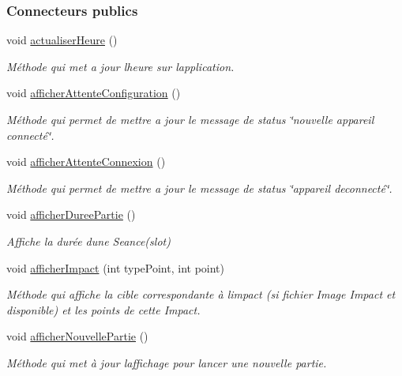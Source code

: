 \subsubsection*{Connecteurs publics}
\begin{DoxyCompactItemize}
\item 
void \hyperlink{class_ihm_ad8b3b13e638ebbfbe8159d00d99ff88f}{actualiser\+Heure} ()
\begin{DoxyCompactList}\small\item\em Méthode qui met a jour l\textquotesingle{}heure sur l\textquotesingle{}application. \end{DoxyCompactList}\item 
void \hyperlink{class_ihm_a3d1f9b366774b538acfcf66195c3c81a}{afficher\+Attente\+Configuration} ()
\begin{DoxyCompactList}\small\item\em Méthode qui permet de mettre a jour le message de status \char`\"{}nouvelle appareil connecté\char`\"{}. \end{DoxyCompactList}\item 
void \hyperlink{class_ihm_a46f511e7be2c138a8fe2dec17d6bb2bf}{afficher\+Attente\+Connexion} ()
\begin{DoxyCompactList}\small\item\em Méthode qui permet de mettre a jour le message de status \char`\"{}appareil deconnecté\char`\"{}. \end{DoxyCompactList}\item 
void \hyperlink{class_ihm_a808bd550b877499a38419a492595822e}{afficher\+Duree\+Partie} ()
\begin{DoxyCompactList}\small\item\em Affiche la durée d\textquotesingle{}une Seance(slot) \end{DoxyCompactList}\item 
void \hyperlink{class_ihm_a591e686d87b027ac16e91b3b9867a58a}{afficher\+Impact} (int type\+Point, int point)
\begin{DoxyCompactList}\small\item\em Méthode qui affiche la cible correspondante à l\textquotesingle{}impact (si fichier Image Impact et disponible) et les points de cette Impact. \end{DoxyCompactList}\item 
void \hyperlink{class_ihm_a90c6b5c75d3903f50ea7c00b8093c686}{afficher\+Nouvelle\+Partie} ()
\begin{DoxyCompactList}\small\item\em Méthode qui met à jour l\textquotesingle{}affichage pour lancer une nouvelle partie. \end{DoxyCompactList}\item 

\end{DoxyCompactItemize}
